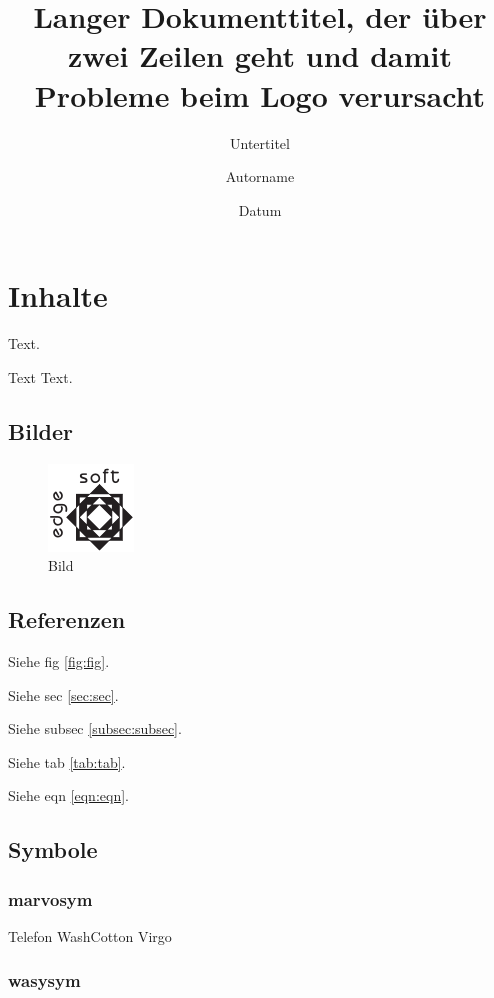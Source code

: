 \documentclass[ngerman]{scrartcl}
\title{Langer Dokumenttitel, der über zwei Zeilen geht und damit Probleme beim Logo verursacht}
\subtitle{Untertitel}
\date{Datum}
\author{Autorname}
\begin{document}
	\maketitle

	\tableofcontents
	\cleardoublepage

	\section{Inhalte}
	\label{sec:sec}

	Text.

	Text  Text.

	\subsection{Bilder}
	\label{subsec:subsec}

	\begin{figure}[htb]
		\caption{Bild}
		\label{fig:fig}
		\includegraphics{testlogo}
	\end{figure}

	\subsection{Referenzen}

	Siehe fig \autoref{fig:fig}.

	Siehe sec \autoref{sec:sec}.

	Siehe subsec \autoref{subsec:subsec}.

	Siehe tab \autoref{tab:tab}.

	Siehe eqn \autoref{eqn:eqn}.

	\subsection{Symbole}

	\subsubsection{marvosym}

	Telefon \Telefon{}
	WashCotton \WashCotton{}
	Virgo \Virgo{}

	\subsubsection{wasysym}
\end{document}
